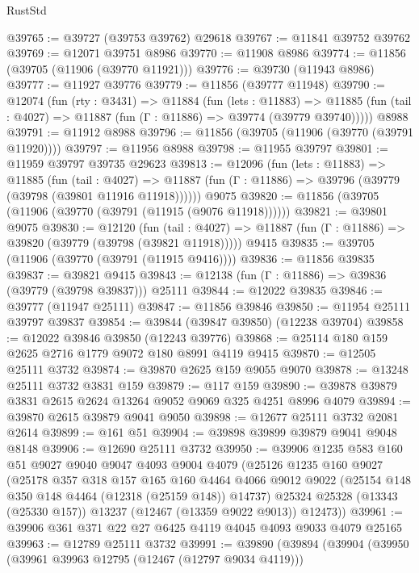 \begin{lexlean}{RustStd}
\begin{coremodule}
@39765 := @39727 (@39753 @39762) @29618
@39767 := @11841 @39752 @39762
@39769 := @12071 @39751 @8986
@39770 := @11908 @8986
@39774 := @11856 (@39705 (@11906 (@39770 @11921)))
@39776 := @39730 (@11943 @8986)
@39777 := @11927 @39776
@39779 := @11856 (@39777 @11948)
@39790 := @12074
    (fun (rty : @3431) =>
    @11884
      (fun (lets : @11883) =>
      @11885 (fun (tail : @4027) => @11887 (fun (Γ : @11886) => @39774 (@39779 @39740)))))
    @8988
@39791 := @11912 @8988
@39796 := @11856 (@39705 (@11906 (@39770 (@39791 @11920))))
@39797 := @11956 @8988
@39798 := @11955 @39797
@39801 := @11959 @39797 @39735 @29623
@39813 := @12096
    (fun (lets : @11883) =>
    @11885
      (fun (tail : @4027) =>
      @11887 (fun (Γ : @11886) => @39796 (@39779 (@39798 (@39801 @11916 @11918))))))
    @9075
@39820 := @11856 (@39705 (@11906 (@39770 (@39791 (@11915 (@9076 @11918))))))
@39821 := @39801 @9075
@39830 := @12120
    (fun (tail : @4027) => @11887 (fun (Γ : @11886) => @39820 (@39779 (@39798 (@39821 @11918)))))
    @9415
@39835 := @39705 (@11906 (@39770 (@39791 (@11915 @9416))))
@39836 := @11856 @39835
@39837 := @39821 @9415
@39843 := @12138 (fun (Γ : @11886) => @39836 (@39779 (@39798 @39837))) @25111
@39844 := @12022 @39835
@39846 := @39777 (@11947 @25111)
@39847 := @11856 @39846
@39850 := @11954 @25111 @39797 @39837
@39854 := @39844 (@39847 @39850) (@12238 @39704)
@39858 := @12022 @39846 @39850 (@12243 @39776)
@39868 := @25114 @180 @159 @2625 @2716 @1779 @9072 @180 @8991 @4119 @9415
@39870 := @12505 @25111 @3732
@39874 := @39870 @2625 @159 @9055 @9070
@39878 := @13248 @25111 @3732 @3831 @159
@39879 := @117 @159
@39890 := @39878 @39879 @3831 @2615 @2624 @13264 @9052 @9069 @325 @4251 @8996 @4079
@39894 := @39870 @2615 @39879 @9041 @9050
@39898 := @12677 @25111 @3732 @2081 @2614
@39899 := @161 @51
@39904 := @39898 @39899 @39879 @9041 @9048 @8148
@39906 := @12690 @25111 @3732
@39950 := @39906
    @1235
    @583
    @160
    @51
    @9027
    @9040
    @9047
    @4093
    @9004
    @4079
    (@25126
      @1235
      @160
      @9027
      (@25178
        @357
        @318
        @157
        @165
        @160
        @4464
        @4066
        @9012
        @9022
        (@25154 @148 @350 @148 @4464 (@12318 (@25159 @148)) @14737)
        @25324
        @25328
        (@13343 (@25330 @157))
        @13237
        (@12467 (@13359 @9022 @9013))
        @12473))
@39961 := @39906 @361 @371 @22 @27 @6425 @4119 @4045 @4093 @9033 @4079 @25165
@39963 := @12789 @25111 @3732
@39991 := @39890
    (@39894
      (@39904
        (@39950
          (@39961 @39963 @12795 (@12467 (@12797 @9034 @4119)))

\end{coremodule}
\end{lexlean}
